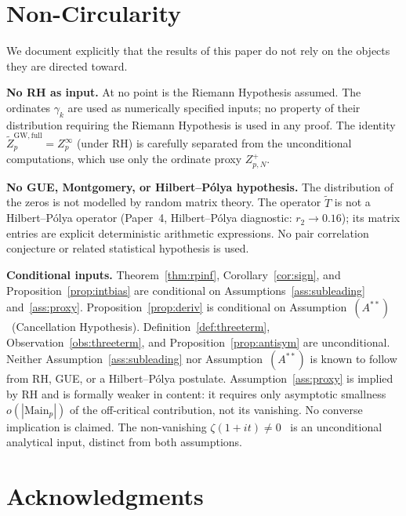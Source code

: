 \documentclass[11pt]{article}
\newcommand{\Tt}{\widetilde{T}}
\newcommand{\Astar}{\ensuremath{(A^{**})}}  %
\begin{document}
\section*{Non-Circularity}
\label{sec:nocirc}

We document explicitly that the results of this paper do not
rely on the objects they are directed toward.

\textbf{No RH as input.}
At no point is the Riemann Hypothesis assumed.
The ordinates $\gamma_k$ are used as numerically specified inputs;
no property of their distribution requiring the Riemann Hypothesis
is used in any proof.
The identity $\widetilde Z_p^{\mathrm{GW,full}}=Z_p^\infty$ (under RH)
is carefully separated from the unconditional computations, which use
only the ordinate proxy $Z_{p,N}^+$.

\textbf{No GUE, Montgomery, or Hilbert--P\'olya hypothesis.}
The distribution of the zeros is not modelled by random matrix theory.
The operator $\Tt$ is not a Hilbert--P\'olya operator (Paper~4,
Hilbert--P\'olya diagnostic: $r_2\to 0.16$); its matrix entries are
explicit deterministic arithmetic expressions.
No pair correlation conjecture or related statistical hypothesis is used.

\textbf{Conditional inputs.}
Theorem~\ref{thm:rpinf}, Corollary~\ref{cor:sign}, and
Proposition~\ref{prop:intbias} are conditional on
Assumptions~\ref{ass:subleading} and~\ref{ass:proxy}.
Proposition~\ref{prop:deriv} is conditional on
Assumption~\Astar\ (Cancellation Hypothesis).
Definition~\ref{def:threeterm}, Observation~\ref{obs:threeterm},
and Proposition~\ref{prop:antisym} are unconditional.
Neither Assumption~\ref{ass:subleading} nor Assumption~\Astar
is known to follow from RH, GUE, or a Hilbert--P\'{o}lya postulate.
Assumption~\ref{ass:proxy} is implied by RH and is formally weaker
in content: it requires only asymptotic smallness
$o(|\mathrm{Main}_p|)$ of the off-critical contribution, not its
vanishing. No converse implication is claimed.
The non-vanishing $\zeta(1+it)\ne 0$~\cite{Hadamard,dlVP}
is an unconditional analytical input, distinct from both assumptions.

\section*{Acknowledgments}
\end{document}
